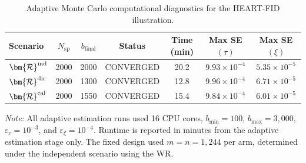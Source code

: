 \begin{table}[ht!]
\centering
\caption{Adaptive Monte Carlo computational diagnostics for the HEART-FID illustration.}
\label{tab:heartfid_computation}
\setlength{\tabcolsep}{4pt}
\renewcommand{\arraystretch}{1.08}
\begin{tabular}{@{}l c c c c c c@{}}
\toprule
\textbf{Scenario} & $N_{\mathrm{sp}}$ & $b_{\text{final}}$ & Status & Time (min) & Max SE$(\tau)$ & Max SE$(\xi)$ \\
\midrule
$\bm{\mathcal R}^{\textup{ind}}$ & 2000 & 2000 & CONVERGED & 20.2 & $9.93\times 10^{-4}$ & $5.35\times 10^{-5}$ \\
$\bm{\mathcal R}^{\textup{dir}}$ & 2000 & 1300 & CONVERGED & 12.8 & $9.96\times 10^{-4}$ & $6.71\times 10^{-5}$ \\
$\bm{\mathcal R}^{\textup{cal}}$ & 2000 & 1550 & CONVERGED & 15.4 & $9.84\times 10^{-4}$ & $6.01\times 10^{-5}$ \\
\bottomrule
\end{tabular}
\parbox{0.92\textwidth}{\footnotesize \textit{Note:} All adaptive estimation runs used 16 CPU cores, $b_{\min}=100$, $b_{\max}=3,000$, $\varepsilon_{\tau}=10^{-3}$, and $\varepsilon_{\xi}=10^{-4}$. Runtime is reported in minutes from the adaptive estimation stage only. The fixed design used $m=n=1,244$ per arm, determined under the independent scenario using the WR.}
\end{table}
